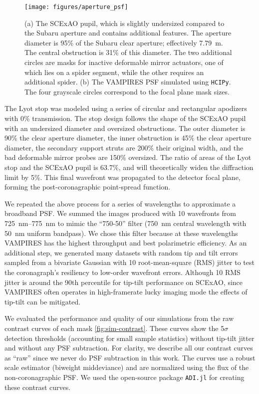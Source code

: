 \documentclass[]{spie}  %
\begin{document}
\begin{figure}
   \centering
   \texttt{[image: figures/aperture\_psf]}
   \caption{(a) The SCExAO pupil, which is slightly undersized compared to the Subaru aperture and contains additional features. The aperture diameter is 95\% of the Subaru clear aperture; effectively \qty{7.79}{\meter}. The central obstruction is 31\% of this diameter. The two additional circles are masks for inactive deformable mirror actuators, one of which lies on a spider segment, while the other requires an additional spider. (b) The VAMPIRES PSF simulated using \texttt{HCIPy}. The four grayscale circles correspond to the focal plane mask sizes.}\label{fig:pupil}
\end{figure}

The Lyot stop was modeled using a series of circular and rectangular apodizers with 0\% transmission. The stop design follows the shape of the SCExAO pupil with an undersized diameter and oversized obstructions. The outer diameter is 90\% the clear aperture diameter, the inner obstruction is 45\% the clear aperture diameter, the secondary support struts are 200\% their original width, and the bad deformable mirror probes are 150\% oversized. The ratio of areas of the Lyot stop and the SCExAO pupil is 63.7\%, and will theoretically widen the diffraction limit by 5\%. This final wavefront was propagated to the detector focal plane, forming the post-coronagraphic point-spread function.

We repeated the above process for a series of wavelengths to approximate a broadband PSF. We summed the images produced with 10 wavefronts from \qtyrange{725}{775}{\nano\meter} to mimic the ``750-50'' filter (\qty{750}{\nano\meter} central wavelength with \qty{50}{\nano\meter} uniform bandpass). We chose this filter because at these wavelengths VAMPIRES has the highest throughput and best polarimetric efficiency. As an additional step, we generated many datasets with random tip and tilt errors sampled from a bivariate Gaussian with \qty{10}{\milliarcsecond} root-mean-square (RMS) jitter to test the coronagraph's resiliency to low-order wavefront errors. Although \qty{10}{\milliarcsecond} RMS jitter is around the 90th percentile for tip-tilt performance on SCExAO, since VAMPIRES often operates in high-framerate lucky imaging mode the effects of tip-tilt can be mitigated.

We evaluated the performance and quality of our simulations from the raw contrast curves of each mask \autoref{fig:sim-contrast}. These curves show the 5$\sigma$ detection thresholds (accounting for small sample statistics\cite{mawet2014}) without tip-tilt jitter and without any PSF subtraction. For clarity, we describe all our contrast curves as ``raw'' since we never do PSF subtraction in this work. The curves use a robust scale estimator (biweight middeviance) and are normalized using the flux of the non-coronagraphic PSF. We used the open-source package \texttt{ADI.jl}\cite{lucas2020} for creating these contrast curves.
\end{document}
